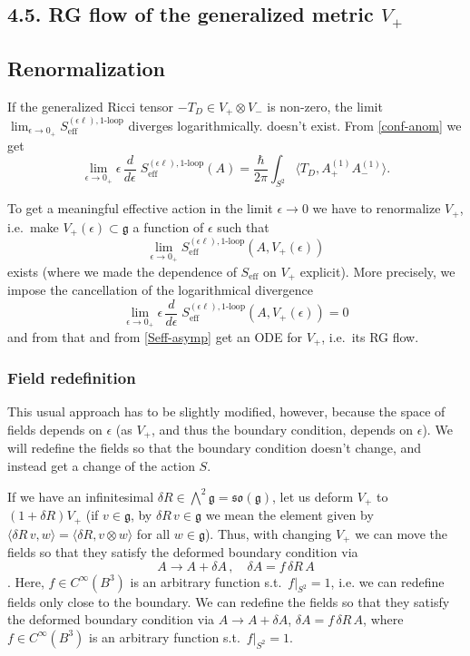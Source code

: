 \documentclass[a4paper]{amsart}
\theoremstyle{plain}
\theoremstyle{definition}
\newcommand{\mf}{\mathfrak}
\newcommand{\g}{\mathfrak{g}}
\newcommand{\bw}{{\textstyle\bigwedge}}
\newcommand{\la}{\langle}
\newcommand{\ra}{\rangle}
\begin{document}
\subsection*{\color{gray} 4.5. RG flow of the generalized metric $V_+$}
\subsection{\color{teal} Renormalization}\label{ss:RGflow}
If the generalized Ricci tensor $-T_{D}\in V_+\otimes V_-$ is non-zero, the limit $\lim_{\epsilon\to0_+}S_\text{eff}^{(\epsilon\ell),\text{1-loop}}$ {\color{teal} diverges logarithmically.} {\color{gray} doesn't exist.}
From \eqref{conf-anom} we get
\begin{equation}\label{Seff-asymp}
  \lim_{\epsilon\to0_+} \epsilon\,\frac d{d\epsilon}\; S_\text{eff}^{(\epsilon\ell),\text{1-loop}}(A)= \frac\hbar{2\pi}\int_{S^2} \la T_{D}, A^{(1)}_+ A^{(1)}_-\ra.  
\end{equation}

To get a meaningful effective action in the limit $\epsilon\to0$ we have to renormalize $V_+$, i.e.\ make $V_+(\epsilon)\subset\g$  a function of $\epsilon$ such that
$$
\lim_{\epsilon\to0_+}S_\text{eff}^{(\epsilon\ell),\text{1-loop}}(A,V_+(\epsilon))
$$
exists (where we made the dependence of $S_\text{eff}$ on $V_+$ explicit). More precisely, we impose {\color{teal} the cancellation of 
the logarithmical divergence}
\begin{equation}\label{RG-howto}
\lim_{\epsilon\to0_+} \epsilon\,\frac d{d\epsilon}\; S_\text{eff}^{(\epsilon\ell),\text{1-loop}}(A,V_+(\epsilon))=0
\end{equation}
and from that and from \eqref{Seff-asymp} get an ODE for $V_+$, i.e.\ its RG flow.

\subsubsection{\color{teal} Field redefinition}
This usual approach has to be slightly modified, however, because the space of fields depends on $\epsilon$ (as $V_+$, and thus the boundary condition, depends on $\epsilon$). We will redefine the fields so that the boundary condition doesn't change, and instead get a change of the action $S$.

If we have an infinitesimal $\delta R\in\bw^2\g=\mf{so}(\g)$, let us deform $V_+$ to $(1+\delta R)V_+$ (if $v\in\g$, by $\delta R\,v\in\g$ we mean the element given by $\la\delta R\,v,w\ra=\la \delta R,v\otimes w\ra$ for all $w\in\g$). {\color{teal} Thus, with changing $V_{+}$ we can move the fields
so that they satisfy the deformed boundary condition via $$A\to A+\delta A\,,\quad \delta A= f\,\delta R\,A$$. Here, $f\in C^\infty(B^3)$ is an arbitrary function s.t.\ $f|_{S^2}=1$, i.e. we can redefine fields only close to the boundary.}
{\color{gray}We can redefine the fields so that they satisfy the deformed boundary condition via $A\to A+\delta A$, $\delta A= f\,\delta R\,A$, where $f\in C^\infty(B^3)$ is an arbitrary function s.t.\ $f|_{S^2}=1$.}
\end{document}
